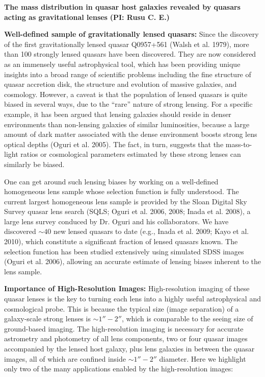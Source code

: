 \documentclass[a4paper,11pt]{article}
\begin{document}
\begin {centering}
{\bf The mass distribution in quasar host galaxies revealed by quasars acting as gravitational lenses} {\bf (PI: Rusu C. E.)}\\
 \end{centering}
 
\medskip
 
{\bf Well-defined sample of gravitationally lensed quasars:} 
Since the discovery of the first gravitationally lensed quasar
Q0957+561 (Walsh et al. 1979), more than 100 strongly lensed quasars
have been discovered. They are now considered as an immensely useful astrophysical
tool, which has been providing unique insights into a broad range of
scientific problems including the fine structure of quasar accretion
disk, the structure and evolution of massive galaxies, and cosmology. 
However, a caveat is that the population of lensed quasars is quite
biased in several ways, due to the ``rare'' nature of strong lensing.
For a specific example, it has been argued that lensing galaxies should
reside in denser environments than non-lensing galaxies of similar
luminosities, because a large amount of dark matter associated with
the dense environment boosts strong lens optical depths (Oguri et
al. 2005). The fact, in turn, suggests that the mass-to-light ratios or
cosmological parameters estimated by these strong lenses can similarly
be biased. 

One can get around such lensing biases by working on a well-defined
homogeneous lens sample whose selection function is fully understood.
The current largest homogeneous lens sample is provided by the Sloan
Digital Sky Survey quasar lens search (SQLS; Oguri et al. 2006, 2008;
Inada et al. 2008), a large lens survey conduced by Dr. Oguri and his 
collaborators. We have discovered $\sim 40$ new
lensed quasars to date (e.g., Inada et al. 2009; Kayo et al. 2010),
which constitute a significant fraction of lensed quasars known. 
The selection function has been studied extensively using simulated
SDSS images (Oguri et al. 2006), allowing an accurate estimate of
lensing biases inherent to the lens sample. 

{\bf Importance of High-Resolution Images:}  
High-resolution imaging of these quasar lenses is the key to turning each
lens into a highly useful astrophysical and cosmological probe. This
is because the typical size (image separation) of a galaxy-scale strong
lenses is $\sim 1''-2''$, which is comparable to the seeing size
of ground-based imaging. The high-resolution imaging is necessary for
accurate astrometry and photometry of all lens components, two or four
quasar images accompanied by the lensed host galaxy, plus lens
galaxies in between the quasar images, all of which are confined
inside $\sim 1''-2''$ diameter. Here we highlight only two of the
many applications enabled by the high-resolution images: 
\end{document}
